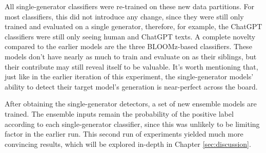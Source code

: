 All single-generator classifiers were re-trained on these new data partitions.
For most classifiers, this did not introduce any change, since they were still only trained and evaluated on a single generator, therefore, for example, the ChatGPT classifiers were still only seeing human and ChatGPT texts.
A complete novelty compared to the earlier models are the three BLOOMz-based classifiers.
These models don't have nearly as much to train and evaluate on as their siblings, but their contribute may still reveal itself to be valuable.
It's worth mentioning that, just like in the earlier iteration of this experiment, the single-generator models' ability to detect their target model's generation is near-perfect across the board.

After obtaining the single-generator detectors, a set of new ensemble models are trained.
The ensemble inputs remain the probability of the positive label according to each single-generator classifier, since this was unlikely to be limiting factor in the earlier run.
This second run of experiments yielded much more convincing results, which will be explored in-depth in Chapter \ref{sec:discussion}.